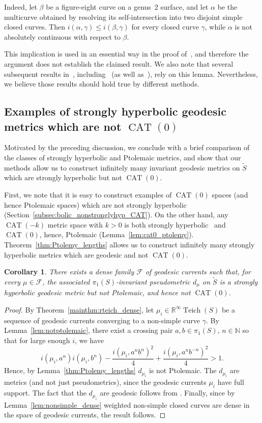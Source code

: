 \documentclass[12pt]{amsart}
\numberwithin{equation}{section}
\numberwithin{figure}{section}
\newtheorem{corollary}[equation]{Corollary}
\theoremstyle{definition}
\theoremstyle{plain}
\DeclareMathOperator{\Teich}{Teich}
\DeclareMathOperator{\CAT}{CAT}
\newcommand*{\wt}[1]{\widetilde{#1}}
\begin{document}
Indeed, let $\beta$ be a figure-eight curve on a genus~2 surface, and let $\alpha$ be the multicurve obtained by resolving its self-intersection into two disjoint simple closed curves.
Then $i(\alpha,\gamma)\le i(\beta,\gamma)$ for every closed curve $\gamma$, while $\alpha$ is not absolutely continuous with respect to $\beta$.

This implication is used in an essential way in the proof of~\cite[Lemma~2.8]{Ham99:Cocycles}, and therefore the argument does not establish the claimed result.
We also note that several subsequent results in~\cite{Ham99:Cocycles}, including~\cite[Theorem~C]{Ham99:Cocycles} (as well as~\cite[Theorems~2.8,~2.9]{Ham99:Cocycles}), rely on this lemma. Nevertheless, we believe those results should hold true by different methods.

\subsection{Examples of strongly hyperbolic geodesic metrics which are not $\CAT(0)$}

Motivated by the preceding discussion, we conclude with a brief comparison of the classes of strongly hyperbolic and Ptolemaic metrics, and show that our methods allow us to construct infinitely many invariant geodesic metrics on $\wt{S}$ which are strongly hyperbolic but not $\CAT(0)$. 

First, we note that it is easy to construct examples of $\CAT(0)$ spaces (and hence Ptolemaic spaces) which are not strongly hyperbolic (Section~\ref{subsec:bolic_nonstronglyhyp_CAT}). On the other hand, any $\CAT(-k)$ metric space with $k>0$ is both strongly hyperbolic~\cite[Theorem~5.1]{NicaSpakula2016} and $\CAT(0)$, hence, Ptolemaic (Lemma~\ref{lem:cat0_ptolemy}). Theorem~\ref{thm:Ptolemy_lengths} allows us to construct infinitely many strongly hyperbolic metrics which are geodesic and not $\CAT(0)$. 

\begin{corollary}
There exists a dense family $\mathcal F$ of geodesic currents such that, for every $\mu\in\mathcal F$, the associated $\pi_1(S)$-invariant pseudometric $d_\mu$ on $\wt S$ is a strongly hyperbolic geodesic metric but not Ptolemaic, and hence not $\CAT(0)$.
\label{cor:sh_not_cat0}
\end{corollary}
\begin{proof}
By Theorem~\ref{mainthm:rteich_dense}, let $\mu_i \in \mathbb{R}^\infty \Teich(S)$ be a sequence of geodesic currents converging to a non-simple curve $\gamma$.
By Lemma~\ref{lem:notptolemaic}, there exist a crossing pair $a,b \in \pi_1(S)$, $n \in \mathbb{N}$ so that for large enough $i$, we have
\[
i(\mu_i, a^n) i(\mu_i,b^n) -\frac{i(\mu_i,a^nb^n)^2}{4} +  \frac{i(\mu_i,a^nb^{-n})^2}{4}>1.
\]
Hence, by Lemma~\ref{thm:Ptolemy_lengths}  $d_{\mu_i}$ is not Ptolemaic.
The $d_{\mu_i}$ are metrics (and not just pseudometrics), since the geodesic currents $\mu_i$ have full support.
The fact that the $d_{\mu_i}$ are geodesic follows from \cite[Proposition~3.6]{DRMG23:Duals}. Finally, since by Lemma~\ref{lem:nonsimple_dense} weighted non-simple closed curves are dense in the space of geodesic currents, the result follows.
\end{proof}
\end{document}
